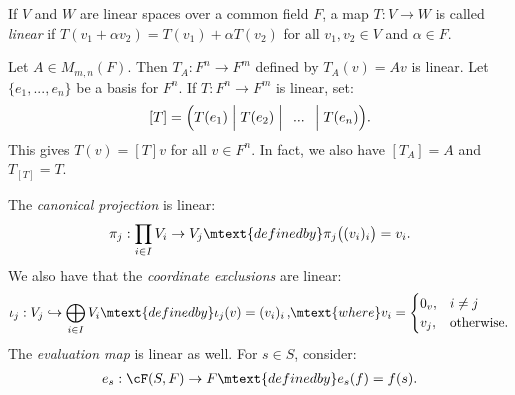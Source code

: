    \begin{definition}
        If $V$ and $W$ are linear spaces over a common field $F$, a map $T:V \rightarrow W$ is called \textit{linear} if $T(v_1 + \alpha v_2) = T(v_1) + \alpha T(v_2)$ for all $v_1,v_2 \in V$ and $\alpha \in F$.
    \end{definition}
    
    \begin{example}
        Let $A \in M_{m,n}(F)$. Then $T_A:F^n \rightarrow F^m$ defined by $T_A(v) = Av$ is linear. Let $\{e_1,...,e_n\}$ be a basis for $F^n$. If $T:F^n \rightarrow F^m$ is linear, set:
            \begin{equation*}
            \begin{split}
                [T] = \Bigl( T(e_1) \Bigm\vert T(e_2) \Bigm\vert \hspace{4.5pt}...\hspace{4.5pt}\Bigm\vert T(e_n) \Bigr).
            \end{split}
            \end{equation*}
        This gives $T(v) = [T]v$ for all $v \in F^n$. In fact, we also have $[T_A] = A$ and $T_{[T]} = T$.
    \end{example}

    \begin{example}
        The \textit{canonical projection} is linear:
            \begin{equation*}
            \begin{split}
                \pi_j: \prod_{i \in I}V_i \rightarrow V_j \mtext{defined by} \pi_j\bigl((v_i)_i\bigr) = v_i.
            \end{split}
            \end{equation*}
        We also have that the \textit{coordinate exclusions} are linear:
            \begin{equation*}
            \begin{split}
                \iota_j: V_j \hookrightarrow \bigoplus_{i \in I}V_i \mtext{defined by} \iota_j(v) = (v_i)_i \hspace{1.5pt}, \hspace{-2pt}\mtext{where} v_i = \begin{cases}
                    0_v, &i \neq j \\
                    v_j, &\text{otherwise}.
                \end{cases}
            \end{split}
            \end{equation*}
        The \textit{evaluation map} is linear as well. For $s \in S$, consider:
            \begin{equation*}
            \begin{split}
                e_s : \cF(S,F) \rightarrow F \mtext{defined by} e_s(f) = f(s).
            \end{split}
            \end{equation*}
    \end{example}



    
    
